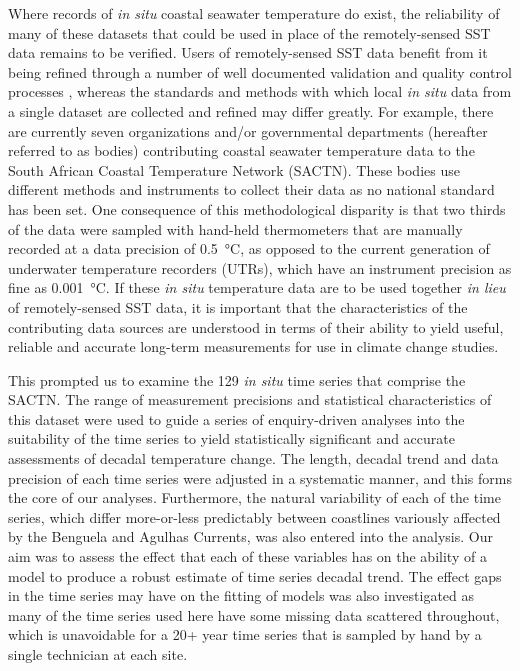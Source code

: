 \documentclass[]{ametsoc}
\begin{document}
Where records of \emph{in situ} coastal seawater temperature do exist, the reliability of many of these datasets that could be used in place of the remotely-sensed SST data remains to be verified. Users of remotely-sensed SST data benefit from it being refined through a number of well documented validation and quality control processes \citep[\emph{e.g.}][]{Reynolds1994, Brown1999, Martin2012}, whereas the standards and methods with which local \emph{in situ} data from a single dataset are collected and refined may differ greatly. For example, there are currently seven organizations and/or governmental departments (hereafter referred to as bodies) contributing coastal seawater temperature data to the South African Coastal Temperature Network (SACTN). These bodies use different methods and instruments to collect their data as no national standard has been set. One consequence of this methodological disparity is that two thirds of the data were sampled with hand-held thermometers that are manually recorded at a data precision of \SI{0.5}{\degreeCelsius}, as opposed to the current generation of underwater temperature recorders (UTRs), which have an instrument precision as fine as \SI{0.001}{\degreeCelsius}. If these \emph{in situ} temperature data are to be used together \emph{in lieu} of remotely-sensed SST data, it is important that the characteristics of the contributing data sources are understood in terms of their ability to yield useful, reliable and accurate long-term measurements for use in climate change studies.

This prompted us to examine the 129 \emph{in situ} time series that comprise the SACTN. The range of measurement precisions and statistical characteristics of this dataset were used to guide a series of enquiry-driven analyses into the suitability of the time series to yield statistically significant and accurate assessments of decadal temperature change. The length, decadal trend and data precision of each time series were adjusted in a systematic manner, and this forms the core of our analyses. Furthermore, the natural variability of each of the time series, which differ more-or-less predictably between coastlines variously affected by the Benguela and Agulhas Currents, was also entered into the analysis. Our aim was to assess the effect that each of these variables has on the ability of a model to produce a robust estimate of time series decadal trend. The effect gaps in the time series may have on the fitting of models was also investigated as many of the time series used here have some missing data scattered throughout, which is unavoidable for a 20+ year time series that is sampled by hand by a single technician at each site.
\end{document}
